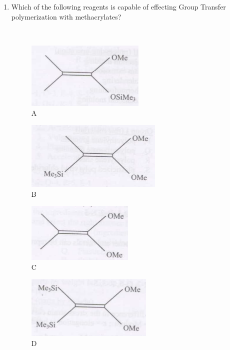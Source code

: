 \documentclass[12pt]{article}
\begin{document}
\begin{enumerate}
 (GATE XE 2008)

\item Which of the following reagents is capable of effecting Group Transfer polymerization with methacrylates?  

\
\begin{multicols}{2}
 \begin{figure}[H]
    \includegraphics[width=0.4\columnwidth]{figs/ass1_h_q11_1.png}
    \caption{A}
    \end{figure}
    
  \begin{figure}[H]
    \includegraphics[width=0.4\columnwidth]{figs/ass1_h_q11_2.png}
    \caption{B}
    \end{figure}
 
  \begin{figure}[H]
    \includegraphics[width=0.4\columnwidth]{figs/ass1_h_q11_3.png}
    \caption{C}
    \end{figure}
    
  \begin{figure}[H]
    \includegraphics[width=0.4\columnwidth]{figs/ass1_h_q11_4.png}
    \caption{D}
    \end{figure}
\end{multicols}    



\end{enumerate}
\end{document}
